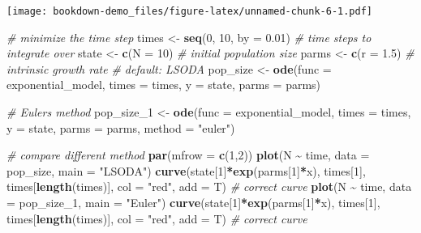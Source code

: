 \documentclass[
]{book}
\newenvironment{Shaded}{\begin{snugshade}}{\end{snugshade}}
\newcommand{\AttributeTok}[1]{\textcolor[rgb]{0.13,0.29,0.53}{#1}}
\newcommand{\CommentTok}[1]{\textcolor[rgb]{0.56,0.35,0.01}{\textit{#1}}}
\newcommand{\DecValTok}[1]{\textcolor[rgb]{0.00,0.00,0.81}{#1}}
\newcommand{\FloatTok}[1]{\textcolor[rgb]{0.00,0.00,0.81}{#1}}
\newcommand{\FunctionTok}[1]{\textcolor[rgb]{0.13,0.29,0.53}{\textbf{#1}}}
\newcommand{\NormalTok}[1]{#1}
\newcommand{\OtherTok}[1]{\textcolor[rgb]{0.56,0.35,0.01}{#1}}
\newcommand{\SpecialCharTok}[1]{\textcolor[rgb]{0.81,0.36,0.00}{\textbf{#1}}}
\newcommand{\StringTok}[1]{\textcolor[rgb]{0.31,0.60,0.02}{#1}}
\begin{document}
\texttt{[image: bookdown-demo\_files/figure-latex/unnamed-chunk-6-1.pdf]}

\begin{Shaded}
\begin{Highlighting}[]
\CommentTok{\# minimize the time step}
\NormalTok{times }\OtherTok{\textless{}{-}} \FunctionTok{seq}\NormalTok{(}\DecValTok{0}\NormalTok{, }\DecValTok{10}\NormalTok{, }\AttributeTok{by =} \FloatTok{0.01}\NormalTok{)  }\CommentTok{\# time steps to integrate over}
\NormalTok{state }\OtherTok{\textless{}{-}} \FunctionTok{c}\NormalTok{(}\AttributeTok{N =} \DecValTok{10}\NormalTok{)  }\CommentTok{\# initial population size}
\NormalTok{parms }\OtherTok{\textless{}{-}} \FunctionTok{c}\NormalTok{(}\AttributeTok{r =} \FloatTok{1.5}\NormalTok{)  }\CommentTok{\# intrinsic growth rate}
\CommentTok{\# default: LSODA}
\NormalTok{pop\_size }\OtherTok{\textless{}{-}} \FunctionTok{ode}\NormalTok{(}\AttributeTok{func =}\NormalTok{ exponential\_model, }\AttributeTok{times =}\NormalTok{ times, }\AttributeTok{y =}\NormalTok{ state, }\AttributeTok{parms =}\NormalTok{ parms)}

\CommentTok{\# Euler\textquotesingle{}s method}
\NormalTok{pop\_size\_1 }\OtherTok{\textless{}{-}} \FunctionTok{ode}\NormalTok{(}\AttributeTok{func =}\NormalTok{ exponential\_model, }\AttributeTok{times =}\NormalTok{ times, }\AttributeTok{y =}\NormalTok{ state, }\AttributeTok{parms =}\NormalTok{ parms, }\AttributeTok{method =} \StringTok{"euler"}\NormalTok{)}

\CommentTok{\# compare different method}
\FunctionTok{par}\NormalTok{(}\AttributeTok{mfrow =} \FunctionTok{c}\NormalTok{(}\DecValTok{1}\NormalTok{,}\DecValTok{2}\NormalTok{))}
\FunctionTok{plot}\NormalTok{(N }\SpecialCharTok{\textasciitilde{}}\NormalTok{ time, }\AttributeTok{data =}\NormalTok{ pop\_size, }\AttributeTok{main =} \StringTok{"LSODA"}\NormalTok{)}
\FunctionTok{curve}\NormalTok{(state[}\DecValTok{1}\NormalTok{]}\SpecialCharTok{*}\FunctionTok{exp}\NormalTok{(parms[}\DecValTok{1}\NormalTok{]}\SpecialCharTok{*}\NormalTok{x), times[}\DecValTok{1}\NormalTok{], times[}\FunctionTok{length}\NormalTok{(times)], }\AttributeTok{col =} \StringTok{"red"}\NormalTok{, }\AttributeTok{add =}\NormalTok{ T) }\CommentTok{\# correct curve}
\FunctionTok{plot}\NormalTok{(N }\SpecialCharTok{\textasciitilde{}}\NormalTok{ time, }\AttributeTok{data =}\NormalTok{ pop\_size\_1, }\AttributeTok{main =} \StringTok{"Euler"}\NormalTok{)}
\FunctionTok{curve}\NormalTok{(state[}\DecValTok{1}\NormalTok{]}\SpecialCharTok{*}\FunctionTok{exp}\NormalTok{(parms[}\DecValTok{1}\NormalTok{]}\SpecialCharTok{*}\NormalTok{x), times[}\DecValTok{1}\NormalTok{], times[}\FunctionTok{length}\NormalTok{(times)], }\AttributeTok{col =} \StringTok{"red"}\NormalTok{, }\AttributeTok{add =}\NormalTok{ T) }\CommentTok{\# correct curve}
\end{Highlighting}
\end{Shaded}
\end{document}
